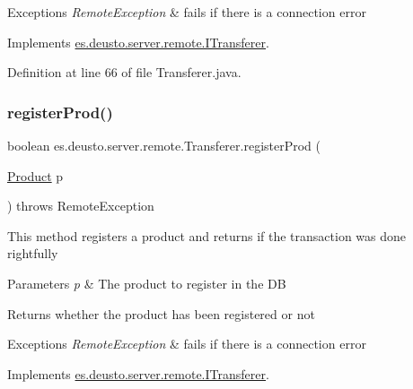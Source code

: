 \begin{DoxyExceptions}{Exceptions}
{\em Remote\+Exception} & fails if there is a connection error \\
\hline
\end{DoxyExceptions}


Implements \hyperlink{interfacees_1_1deusto_1_1server_1_1remote_1_1_i_transferer_ab767521556fc61bc5a39306080f00cae}{es.\+deusto.\+server.\+remote.\+I\+Transferer}.



Definition at line 66 of file Transferer.\+java.

\mbox{\label{classes_1_1deusto_1_1server_1_1remote_1_1_transferer_a64c1f3b57b74106df83335b124937afe}} 
\subsubsection{\texorpdfstring{register\+Prod()}{registerProd()}}
{\footnotesize\ttfamily boolean es.\+deusto.\+server.\+remote.\+Transferer.\+register\+Prod (\begin{DoxyParamCaption}\item[{\hyperlink{classes_1_1deusto_1_1server_1_1db_1_1data_1_1_product}{Product}}]{p }\end{DoxyParamCaption}) throws Remote\+Exception}

This method registers a product and returns if the transaction was done rightfully 
\begin{DoxyParams}{Parameters}
{\em p} & The product to register in the DB \\
\hline
\end{DoxyParams}
\begin{DoxyReturn}{Returns}
whether the product has been registered or not 
\end{DoxyReturn}

\begin{DoxyExceptions}{Exceptions}
{\em Remote\+Exception} & fails if there is a connection error \\
\hline
\end{DoxyExceptions}


Implements \hyperlink{interfacees_1_1deusto_1_1server_1_1remote_1_1_i_transferer_a06629c7021aae4d2ce1a449726102ded}{es.\+deusto.\+server.\+remote.\+I\+Transferer}.



